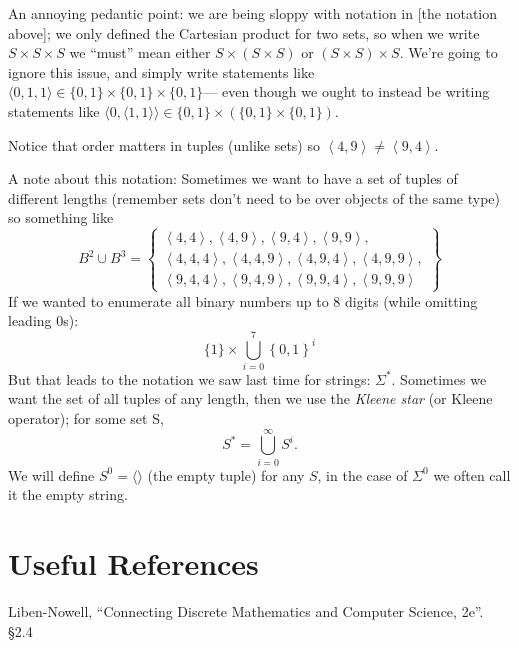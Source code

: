 \begin{tcolorbox}[colback=blue!5,colframe=blue!75!black,title=Quote from Liben-Nowell \S2.4]
An annoying pedantic point: we are being sloppy with notation in [the notation above]; 
we only defined the Cartesian product for two sets, 
so when we write $S\times S\times S$ we “must” mean either $S\times (S\times S)$ or $(S\times S)\times S$. 
We’re going to ignore this issue, and simply write statements like $\langle 0, 1, 1\rangle \in \{0, 1\}\times \{0, 1\} \times \{0, 1\}$---%
even though we ought to instead be writing statements like $\langle 0, \langle1, 1\rangle\rangle \in \{0, 1\}\times (\{0, 1\} \times \{0, 1\})$.
\end{tcolorbox}
 
Notice that order matters in tuples (unlike sets) so $ \left\langle 4,9 \right\rangle \neq \left\langle 9,4 \right\rangle$.

A note about this notation:
Sometimes we want to have a set of tuples of different lengths (remember sets don't need to be over objects of the same type) 
so something like 
\[
B^2 \cup B^3 = \left\{  \begin{matrix}\left\langle 4,4 \right\rangle, \left\langle 4,9 \right\rangle,  \left\langle 9,4 \right\rangle, \left\langle 9,9 \right\rangle,\\
				\left\langle 4,4,4 \right\rangle, \left\langle 4,4,9 \right\rangle,  \left\langle 4,9,4 \right\rangle, \left\langle 4,9,9 \right\rangle,\\
				\left\langle 9,4,4 \right\rangle, \left\langle 9,4,9 \right\rangle,  \left\langle 9,9,4 \right\rangle, \left\langle 9,9,9 \right\rangle \end{matrix}\right\}
\]
If we wanted to enumerate all binary numbers up to 8 digits (while omitting leading 0s):
\[
\{1\} \times \bigcup_{i=0}^7 \left\{0,1\right\}^i
\]
But that leads to the notation we saw last time for strings: $\Sigma^*$.
Sometimes we want the set of all tuples of any length, then we use the \emph{Kleene star} (or Kleene operator); 
for some set S, 
\[
S^* =  \bigcup_{i=0}^\infty S^i.
\]
We will define $S^0 = \langle\rangle$ (the empty tuple) for any $S$, in the case of $\Sigma^0$ we often call it the empty string.

\section*{Useful References}
Liben-Nowell, ``Connecting Discrete Mathematics and Computer Science, 2e''. \S 2.4

